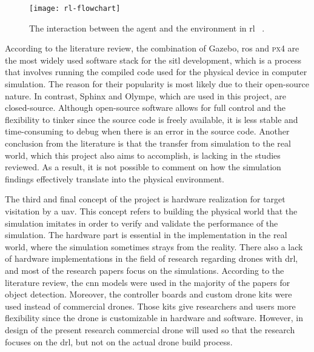\documentclass[../main.tex]{subfiles}
\begin{document}
\begin{figure}[tb] 
    \centering
    \texttt{[image: rl-flowchart]} 
    \caption[The interaction between the agent and the
        environment in \gls{rl}.]
    {The interaction between the agent and the
        environment in \gls{rl}%
        ~\cite[Fig.~3.1]{Sut20}.} 
    \label{fig:rl-flowchart} 
\end{figure}

According to the literature review, 
the combination of Gazebo, \gls{ros}
and \textsc{px4} are the most widely used software stack 
for the \gls{sitl} development,
which is a process that involves running the compiled code
used for the physical device in computer simulation.
The reason for their popularity is most likely 
due to their open-source nature. 
In contrast, Sphinx and Olympe, which are used in this project, 
are closed-source.
Although open-source software 
allows for full control and the flexibility to tinker
since the source code is freely available,
it is less stable and time-consuming to debug
when there is an error in the source code.
Another conclusion from the literature is that 
the transfer from simulation to the real world,
which this project also aims to accomplish,
is lacking in the studies reviewed.
As a result, it is not possible to comment on 
how the simulation findings effectively translate
into the physical environment.

The third and final concept of the project 
is hardware realization for target visitation by a \gls{uav}.
This concept refers to building the physical world
that the simulation imitates in order to 
verify and validate the performance of the simulation.
The hardware part is essential in the implementation 
in the real world, where the simulation 
sometimes strays from the reality.
There also a lack of hardware implementations in 
the field of research regarding drones with \gls{drl}, 
and most of the research papers focus on the simulations.
According to the literature review, the \gls{cnn} 
models were used in the majority of the papers for object detection. 
Moreover, the controller boards and custom drone kits 
were used instead of commercial drones.
Those kits give researchers and users more flexibility 
since the drone is customizable 
in hardware and software. However, in design of the present research commercial drone will used so that the research focuses on the \gls{drl}, but not on the actual drone build process. 
 
\end{document}
